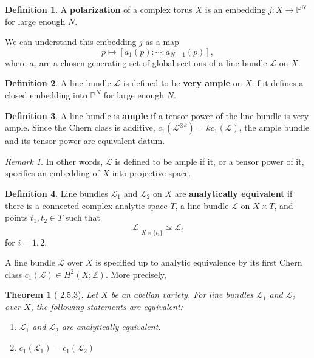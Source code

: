 \documentclass[12pt,reqno]{amsart}
\newcommand{\Z}{\mathbb{Z}}
\newcommand{\mc}{\mathcal}
\renewcommand{\P}{\mathbb{P}}
\newtheorem*{thm*}{Theorem}
\theoremstyle{definition}
\newtheorem{defn}{Definition}
\theoremstyle{remark}
\newtheorem*{remark}{Remark}
\begin{document}
\begin{defn} A \textbf{polarization} of a complex torus $X$ is an embedding $j: X \to \P^N$ for large enough $N$. \end{defn}


We can understand this embedding $j$ as a map $$p \mapsto [a_1(p) : \cdots : a_{N-1}(p)],$$ where $a_i$ are a chosen generating set of global sections of a line bundle $\mc{L}$ on $X$. 

\begin{defn} A line bundle $\mc{L}$ is defined to be \textbf{very ample} on $X$ if it defines a closed embedding into $\P^N$ for large enough $N$.
\end{defn}

\begin{defn} A line bundle is \textbf{ample} if a tensor power of the line bundle is very ample. Since the Chern class is additive, $c_1(\mc{L}^{\otimes k}) = kc_1(\mc{L})$, the ample bundle and its tensor power are equivalent datum. \end{defn} 

\begin{remark} In other words, $\mc{L}$ is defined to be ample if it, or a tensor power of it, specifies an embedding of $X$ into projective space.\end{remark}



\begin{defn} Line bundles $\mc{L}_1$ and $\mc{L}_2$  on $X$ are \textbf{analytically equivalent} if there is a connected complex analytic space $T$, a line bundle $\mc{L}$ on $X \times T$, and points $t_1, t_2 \in T$ such that $$\mc{L} |_{X\times \{t_i\}} \simeq \mc{L}_i$$ for $i = 1, 2$. \end{defn}

A line bundle $\mc{L}$ over $X$ is specified up to analytic equivalence by its first Chern class $c_1(\mc{L}) \in H^2(X; \Z)$. More precisely,

\begin{thm*} 
[\cite{bl} 2.5.3] Let $X$ be an abelian variety. For line bundles $\mc{L}_1$ and $\mc{L}_2$ over $X$, the following statements are equivalent: 
\begin{enumerate} 
\item $\mc{L}_1$ and $\mc{L}_2$ are analytically equivalent.
\item $c_1(\mc{L}_1) = c_1(\mc{L}_2)$
\end{enumerate}
\end{thm*}
\end{document}
